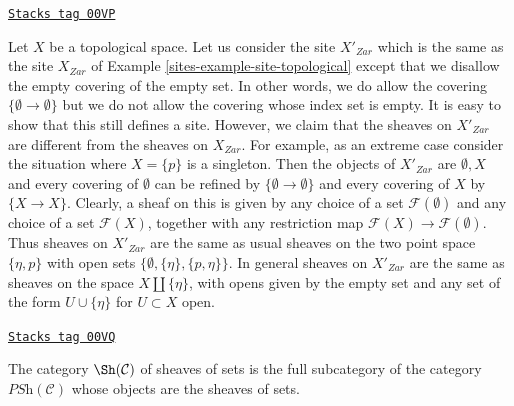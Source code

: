 \begin{example}
\label{sites-example-topological-wrong}
\href{https://stacks.math.columbia.edu/tag/00VP}{\texttt{Stacks tag 00VP}}

Let $X$ be a topological space. Let us consider the site $X'_{Zar}$ which is
the same as the site $X_{Zar}$ of
Example \ref{sites-example-site-topological} except that
we disallow the empty covering of the empty set.
In other words, we do allow the covering $\{\emptyset \to \emptyset\}$
but we do not allow the covering whose index set is empty.
It is easy to show that this still defines a site. However,
we claim that the sheaves on $X'_{Zar}$ are different
from the sheaves on $X_{Zar}$. For example, as an extreme
case consider the situation where $X = \{p\}$ is a singleton.
Then the objects of $X'_{Zar}$ are $\emptyset, X$
and every covering of $\emptyset$ can be refined by
$\{\emptyset \to \emptyset\}$ and every covering of $X$ by $\{X \to X\}$.
Clearly, a sheaf on this is given by any choice of
a set $\mathcal{F}(\emptyset)$ and any choice of a
set $\mathcal{F}(X)$, together with any restriction map
$\mathcal{F}(X) \to \mathcal{F}(\emptyset)$. Thus sheaves
on $X'_{Zar}$ are the same as usual sheaves on the two point space
$\{\eta, p\}$ with open sets $\{\emptyset, \{\eta\}, \{p, \eta\}\}$.
In general sheaves on $X'_{Zar}$ are the same as sheaves
on the space $X \amalg \{\eta\}$, with opens given by
the empty set and any set of the form $U \cup \{\eta\}$ for
$U \subset X$ open.
\end{example}


\begin{definition}
\label{sites-definition-category-sheaves-sets}
\href{https://stacks.math.columbia.edu/tag/00VQ}{\texttt{Stacks tag 00VQ}}

The category {\it $\Sh(\mathcal{C})$}
of sheaves of sets is the full subcategory of the category
$\textit{PSh}(\mathcal{C})$ whose objects are the sheaves of sets.
\end{definition}

